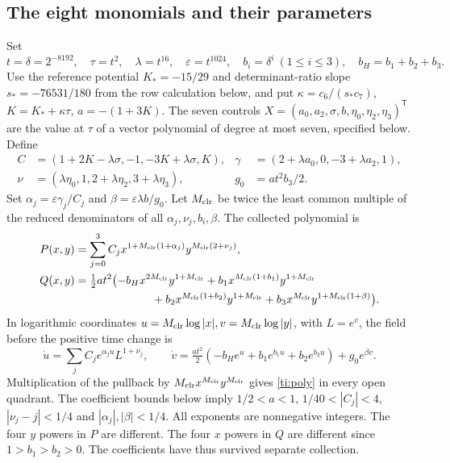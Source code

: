 

\subsection{The eight monomials and their parameters}
Set
\[
 t=\delta=2^{-8192},\quad \tau=t^2,\quad \lambda=t^{16},\quad
 \varepsilon=t^{1024},\quad b_i=\delta^i\ (1\le i\le3),\quad b_H=b_1+b_2+b_3 .
\]
Use the reference potential $K_*=-15/29$ and determinant-ratio slope
$s_*=-76531/180$ from the row calculation below, and put
$\kappa=c_6/(s_*c_7)$, $K=K_*+\kappa\tau$, $a=-(1+3K)$.
The seven controls $X=(a_0,a_2,\sigma,b,\eta_0,\eta_2,\eta_3)^{\mathsf T}$
are the value at $\tau$ of a vector polynomial of degree at most seven,
specified below. Define
\begin{align*}
 C&=(1+2K-\lambda\sigma,-1,-3K+\lambda\sigma,K),&
 \gamma&=(2+\lambda a_0,0,-3+\lambda a_2,1),\\
 \nu&=(\lambda\eta_0,1,2+\lambda\eta_2,3+\lambda\eta_3),&
 g_0&=at^2 b_3/2.
\end{align*}
Set $\alpha_j=\varepsilon\gamma_j/C_j$ and $\beta=\varepsilon\lambda b/g_0$.
Let $M_{\mathrm{clr}}{}$ be twice the least common multiple of the reduced denominators of
all $\alpha_j,\nu_j,b_i,\beta$. The collected polynomial is
\begin{align}
 P(x,y)&=\sum_{j=0}^3 C_j x^{1+\Mclr{}(1+\alpha_j)}y^{\Mclr{}(2+\nu_j)},\notag\\
 Q(x,y)&=\tfrac12 at^2\bigl(-b_Hx^{2\Mclr{}}y^{1+\Mclr{}}
 +b_1x^{\Mclr{}(1+b_1)}y^{1+\Mclr{}}\notag\\
 &\hspace{24mm}{}+b_2x^{\Mclr{}(1+b_2)}y^{1+\Mclr{}}
 +b_3x^{\Mclr}y^{1+\Mclr{}(1+\beta)}\bigr).                               \label{ti:poly}
\end{align}
In logarithmic coordinates $u=M_{\mathrm{clr}}{}\log|x|, v=M_{\mathrm{clr}}{}\log|y|$, with $L=e^v$, the
field before the positive time change is
\[
 \dot u=\sum_j C_j e^{\alpha_j u} L^{1+\nu_j},\qquad
 \dot v=\tfrac{at^2}{2}(-b_H e^u+b_1 e^{b_1u}+b_2 e^{b_2u})+g_0e^{\beta v}.
\]
Multiplication of the pullback by $M_{\mathrm{clr}}{}x^{M_{\mathrm{clr}}}y^{M_{\mathrm{clr}}}$ gives \eqref{ti:poly} in every
open quadrant. The coefficient bounds below imply $1/2<a<1$,
$1/40<|C_j|<4$, $|\nu_j-j|<1/4$ and $|\alpha_j|,|\beta|<1/4$.
All exponents are nonnegative integers. The four $y$ powers in $P$ are
different. The four $x$ powers in $Q$ are different since $1>b_1>b_2>0$.
The coefficients have thus survived separate collection.


